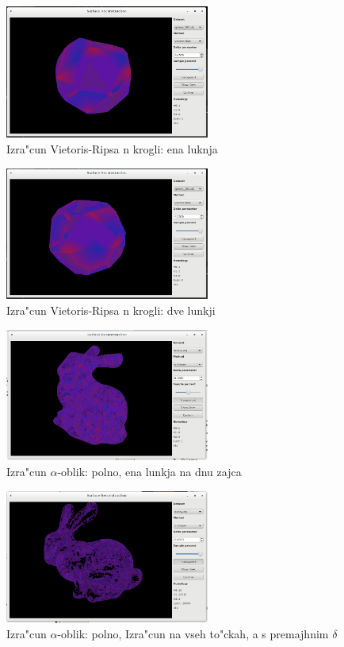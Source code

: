 \documentclass[11pt]{article}
\begin{document}
\begin{figure}[htb]
    \centering
    \includegraphics[width=0.6\textwidth]{vr_1hole.png}
    \caption{Izra"cun Vietoris-Ripsa n krogli: ena luknja}
    \label{fig:vr3}
\end{figure}

\begin{figure}[htb]
    \centering
    \includegraphics[width=0.6\textwidth]{vr_2hole.png}
    \caption{Izra"cun Vietoris-Ripsa n krogli: dve lunkji}
    \label{fig:vr4}
\end{figure}

\begin{figure}[htb]
    \centering
    \includegraphics[width=0.6\textwidth]{alpha_full.png}
    \caption{Izra"cun $\alpha$-oblik: polno, ena lunkja na dnu zajca}
    \label{fig:a1}
\end{figure}

\begin{figure}[htb]
    \centering
    \includegraphics[width=0.6\textwidth]{alpha_lowdelta.png}
    \caption{Izra"cun $\alpha$-oblik: polno, Izra"cun na vseh to"ckah, a s premajhnim $\delta$}
    \label{fig:a1}
\end{figure}
\end{document}
